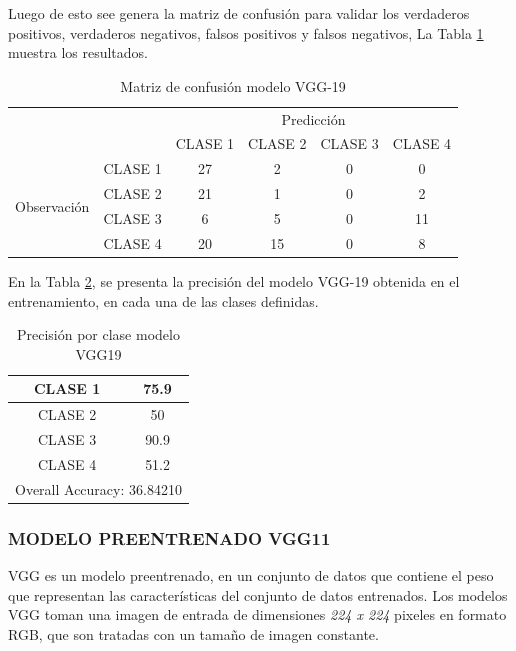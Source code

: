 \newpage
Luego de esto see genera la matriz de confusión para validar los verdaderos positivos, verdaderos negativos, falsos positivos y falsos negativos, La Tabla \ref{fig:MC_VGG19} muestra los resultados.


\begin{table}[htbp]
	\centering
	\begin{tabular}{|c|l|c|c|c|c|}
		\hline
		\multicolumn{2}{|c|}{\multirow{2}[4]{*}{}} & \multicolumn{4}{c|}{Predicción} \bigstrut\\
		\cline{3-6}    \multicolumn{2}{|c|}{} & CLASE 1 & CLASE 2 & CLASE 3 & CLASE 4 \bigstrut\\
		\hline
		\multirow{4}[8]{*}{\begin{sideways}Observación\end{sideways}} & CLASE 1 & 27     & 2     & 0    & 0 \bigstrut\\
		\cline{2-6}     & CLASE 2 & 21     & 1     & 0    & 2 \bigstrut\\
		\cline{2-6}      & CLASE 3 & 6     & 5     & 0    & 11 \bigstrut\\
		\cline{2-6}     & CLASE 4 & 20     & 15     & 0    & 8 \bigstrut\\
		\hline
	\end{tabular}%
	\caption{Matriz de confusión modelo VGG-19}
	\label{fig:MC_VGG19}
\end{table}%

En la Tabla \ref{fig:ACU_VGG19}, se presenta la precisión del modelo VGG-19 obtenida en el entrenamiento, en cada una de las clases definidas.

\begin{table}[htbp]
	\centering
	\begin{tabular}{|c|c|}
		\hline
		CLASE 1 & 75.9 \bigstrut\\
		\hline
		CLASE 2 & 50 \bigstrut\\
		\hline
		CLASE 3 & 90.9 \bigstrut\\
		\hline
		CLASE 4 & 51.2 \bigstrut\\
		\hline
		\multicolumn{2}{|c|}{Overall Accuracy: 36.84210} \bigstrut\\
		\hline
	\end{tabular}%
	\caption{Precisión por clase modelo VGG19}
	\label{fig:ACU_VGG19}
\end{table}%


\newpage
\subsubsection{\MakeUppercase{Modelo preentrenado VGG11}}
VGG es un modelo preentrenado, en un conjunto de datos que contiene el peso que representan las características del conjunto de datos entrenados. Los modelos VGG toman una imagen de entrada de dimensiones \textit{224 x 224} pixeles en formato RGB, que son tratadas con un tamaño de imagen constante.\\



